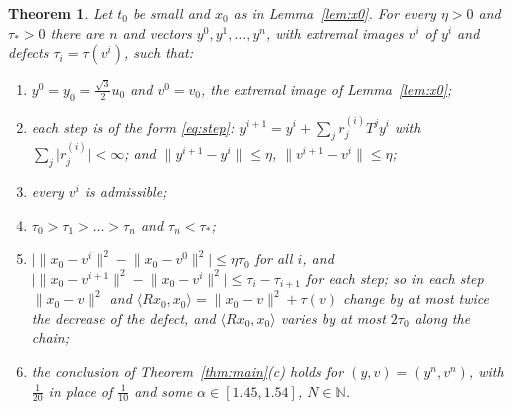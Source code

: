 \documentclass[11pt]{article}
\newtheorem{theorem}{Theorem}
\theoremstyle{definition}
\newcommand{\N}{\mathbb{N}}
\newcommand{\ip}[2]{\langle #1,#2\rangle}
\newcommand{\norm}[1]{\lVert #1\rVert}
\newcommand{\abs}[1]{\lvert #1\rvert}
\begin{document}
\begin{theorem}\label{thm:path}
Let $t_0$ be small and $x_0$ as in Lemma~\ref{lem:x0}. For every $\eta>0$ and $\tau_*>0$ there
are $n$ and vectors $y^0,y^1,\dots,y^n$, with extremal images $v^i$ of $y^i$ and defects
$\tau_i=\tau(v^i)$, such that:
\begin{enumerate}[label=\textup{(\alph*)}]
\item $y^0=y_0=\frac{\sqrt3}2u_0$ and $v^0=v_0$, the extremal image of Lemma~\ref{lem:x0};
\item each step is of the form \eqref{eq:step}:
$y^{i+1}=y^i+\sum_jr^{(i)}_jT^jy^i$ with $\sum_j\abs{r^{(i)}_j}<\infty$; and
$\norm{y^{i+1}-y^i}\le\eta$, $\norm{v^{i+1}-v^i}\le\eta$;
\item every $v^i$ is admissible;
\item $\tau_0>\tau_1>\dots>\tau_n$ and $\tau_n<\tau_*$;
\item $\bigl|\norm{x_0-v^i}^2-\norm{x_0-v^0}^2\bigr|\le\eta\tau_0$ for all $i$, and
$\bigl|\norm{x_0-v^{i+1}}^2-\norm{x_0-v^i}^2\bigr|\le\tau_i-\tau_{i+1}$ for each step; so
in each step $\norm{x_0-v}^2$ and $\ip{Rx_0}{x_0}=\norm{x_0-v}^2+\tau(v)$ change by at most
twice the decrease of the defect, and $\ip{Rx_0}{x_0}$ varies by at most $2\tau_0$ along the
chain;
\item the conclusion of Theorem~\ref{thm:main}(c) holds for $(y,v)=(y^n,v^n)$, with
$\frac1{20}$ in place of $\frac1{10}$ and some $\alpha\in[1.45,1.54]$, $N\in\N$.
\end{enumerate}
\end{theorem}
\end{document}

